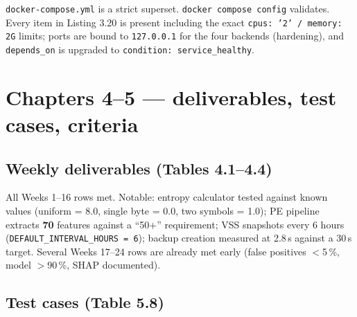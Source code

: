 \documentclass[11pt,a4paper]{article}
\begin{document}
\texttt{docker-compose.yml} is a strict superset. \texttt{docker compose config} validates.
Every item in Listing 3.20 is present including the exact \texttt{cpus: '2' / memory: 2G}
limits; ports are bound to \texttt{127.0.0.1} for the four backends (hardening), and
\texttt{depends\_on} is upgraded to \texttt{condition: service\_healthy}.

\section{Chapters 4--5 --- deliverables, test cases, criteria}

\subsection{Weekly deliverables (Tables 4.1--4.4)}

All Weeks 1--16 rows met. Notable: entropy calculator tested against known values
(uniform = 8.0, single byte = 0.0, two symbols = 1.0); PE pipeline extracts \textbf{70}
features against a ``50+'' requirement; VSS snapshots every 6 hours
(\texttt{DEFAULT\_INTERVAL\_HOURS = 6}); backup creation measured at 2.8\,s against a 30\,s
target. Several Weeks 17--24 rows are already met early (false positives $<$5\,\%,
model $>$90\,\%, SHAP documented).

\subsection{Test cases (Table 5.8)}
\end{document}
